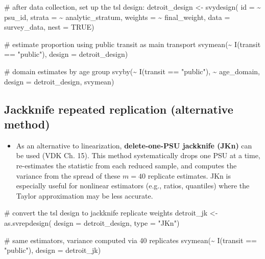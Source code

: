\documentclass[
  11pt,
]{article}
\newenvironment{Shaded}{\begin{snugshade}}{\end{snugshade}}
\newcommand{\AttributeTok}[1]{\textcolor[rgb]{0.40,0.45,0.13}{#1}}
\newcommand{\CommentTok}[1]{\textcolor[rgb]{0.37,0.37,0.37}{#1}}
\newcommand{\ConstantTok}[1]{\textcolor[rgb]{0.56,0.35,0.01}{#1}}
\newcommand{\FunctionTok}[1]{\textcolor[rgb]{0.28,0.35,0.67}{#1}}
\newcommand{\NormalTok}[1]{\textcolor[rgb]{0.00,0.23,0.31}{#1}}
\newcommand{\OtherTok}[1]{\textcolor[rgb]{0.00,0.23,0.31}{#1}}
\newcommand{\SpecialCharTok}[1]{\textcolor[rgb]{0.37,0.37,0.37}{#1}}
\newcommand{\StringTok}[1]{\textcolor[rgb]{0.13,0.47,0.30}{#1}}
\providecommand{\tightlist}{%
  \setlength{\itemsep}{0pt}\setlength{\parskip}{0pt}}\usepackage{longtable,booktabs,array}
\begin{document}
\begin{Shaded}
\begin{Highlighting}[]
\CommentTok{\# after data collection, set up the tsl design:}
\NormalTok{detroit\_design }\OtherTok{\textless{}{-}} \FunctionTok{svydesign}\NormalTok{(}
  \AttributeTok{id      =} \SpecialCharTok{\textasciitilde{}}\NormalTok{ psu\_id,}
  \AttributeTok{strata  =} \SpecialCharTok{\textasciitilde{}}\NormalTok{ analytic\_stratum,}
  \AttributeTok{weights =} \SpecialCharTok{\textasciitilde{}}\NormalTok{ final\_weight,}
  \AttributeTok{data    =}\NormalTok{ survey\_data,}
  \AttributeTok{nest    =} \ConstantTok{TRUE}\NormalTok{)}

\CommentTok{\# estimate proportion using public transit as main transport}
\FunctionTok{svymean}\NormalTok{(}\SpecialCharTok{\textasciitilde{}} \FunctionTok{I}\NormalTok{(transit }\SpecialCharTok{==} \StringTok{"public"}\NormalTok{), }\AttributeTok{design =}\NormalTok{ detroit\_design)}

\CommentTok{\# domain estimates by age group}
\FunctionTok{svyby}\NormalTok{(}\SpecialCharTok{\textasciitilde{}} \FunctionTok{I}\NormalTok{(transit }\SpecialCharTok{==} \StringTok{"public"}\NormalTok{), }\SpecialCharTok{\textasciitilde{}}\NormalTok{ age\_domain,}
      \AttributeTok{design =}\NormalTok{ detroit\_design, svymean)}
\end{Highlighting}
\end{Shaded}

\subsection{Jackknife repeated replication (alternative
method)}\label{jackknife-repeated-replication-alternative-method}

\begin{itemize}
\tightlist
\item
  As an alternative to linearization, \textbf{delete-one-PSU jackknife
  (JKn)} can be used (VDK Ch. 15). This method systematically drops one
  PSU at a time, re-estimates the statistic from each reduced sample,
  and computes the variance from the spread of these \(m = 40\)
  replicate estimates. JKn is especially useful for nonlinear estimators
  (e.g., ratios, quantiles) where the Taylor approximation may be less
  accurate.
\end{itemize}

\begin{Shaded}
\begin{Highlighting}[]
\CommentTok{\# convert the tsl design to jackknife replicate weights}
\NormalTok{detroit\_jk }\OtherTok{\textless{}{-}} \FunctionTok{as.svrepdesign}\NormalTok{(}
  \AttributeTok{design =}\NormalTok{ detroit\_design,}
  \AttributeTok{type   =} \StringTok{"JKn"}\NormalTok{)}

\CommentTok{\# same estimators, variance computed via 40 replicates}
\FunctionTok{svymean}\NormalTok{(}\SpecialCharTok{\textasciitilde{}} \FunctionTok{I}\NormalTok{(transit }\SpecialCharTok{==} \StringTok{"public"}\NormalTok{), }\AttributeTok{design =}\NormalTok{ detroit\_jk)}
\end{Highlighting}
\end{Shaded}
\end{document}
